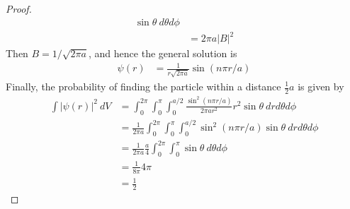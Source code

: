\documentclass[11pt]{article}
\theoremstyle{definition}
\begin{document}
\begin{proof}{2.4}
\begin{align*}
    \sin\theta~d\theta d\phi\\
    &= 2\pi a |B|^2
\end{align*}
Then $B = 1/\sqrt{2\pi a}$, and hence the general solution is
\begin{align*}
    \psi(r) &= \frac{1}{r\sqrt{2\pi a}}\sin(n\pi r/a)
\end{align*}
Finally, the probability of finding the particle within a distance
$\frac{1}{2}a$ is given by
\begin{align*}
    \int |\psi(r)|^2~dV &=\int_0^{2\pi}\int_0^\pi\int_0^{a/2}
    \frac{\sin^2(n\pi r/a)}{2\pi a r^2}r^2\sin\theta~drd\theta d\phi\\
    &=\frac{1}{2\pi a}\int_0^{2\pi}\int_0^\pi\int_0^{a/2}
    \sin^2(n\pi r/a)\sin\theta~drd\theta d\phi\\
    &=\frac{1}{2\pi a}\frac{a}{4}\int_0^{2\pi}\int_0^\pi
    \sin\theta~d\theta d\phi\\
    &=\frac{1}{8\pi} 4\pi\\
    &= \frac{1}{2}
\end{align*}
\end{proof}
\end{document}
